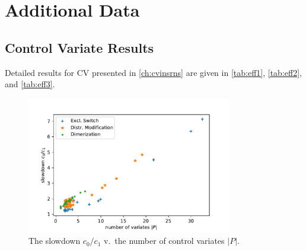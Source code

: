 \chapter{Additional Data}
\section{Control Variate Results}
Detailed results for \acl{CV} presented in \autoref{ch:cvinsrns} are
given in \autoref{tab:eff1}, \autoref{tab:eff2}, and \autoref{tab:eff3}.
\begin{figure}[htb]
  \centering
  \includegraphics[width=0.8\textwidth]{gfx/cv_slowdown.pdf}
  \caption{The slowdown $c_0/c_1$ v.\ the number of control variates $|P|$.}
\end{figure}
